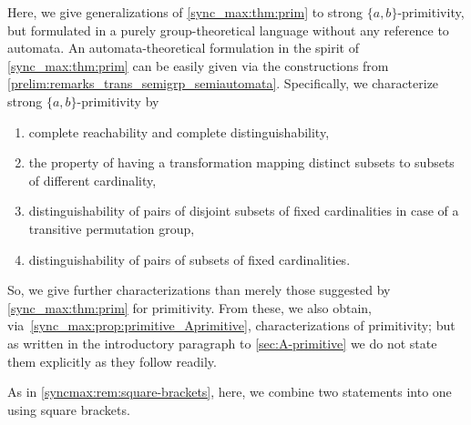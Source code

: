 
Here, we give generalizations of \cref{sync_max:thm:prim} 
to strong $\{a,b\}$-primitivity, but formulated
in a purely group-theoretical language without any 
reference to automata.
An automata-theoretical formulation 
in the spirit of \cref{sync_max:thm:prim} %
can be easily given via the constructions from \cref{prelim:remarks_trans_semigrp_semiautomata}.
Specifically, we characterize strong $\{a,b\}$-primitivity
by
\begin{enumerate}
	\item complete reachability and complete distinguishability,
	
	\item the property of having a transformation mapping
	distinct subsets to subsets of different cardinality,
	
	\item distinguishability of pairs of disjoint subsets of fixed cardinalities in case of a transitive permutation group,

    \item distinguishability of pairs of subsets of fixed cardinalities.
\end{enumerate}

So, we give further characterizations
than merely those suggested by \cref{sync_max:thm:prim}
for primitivity. From these, we also obtain, via~\cref{sync_max:prop:primitive_Aprimitive}, 
characterizations of primitivity; but as written in the introductory paragraph
to \cref{sec:A-primitive} we do not state them explicitly as they follow readily.

As in \cref{syncmax:rem:square-brackets}, here, we combine two statements into one using square
brackets. %

